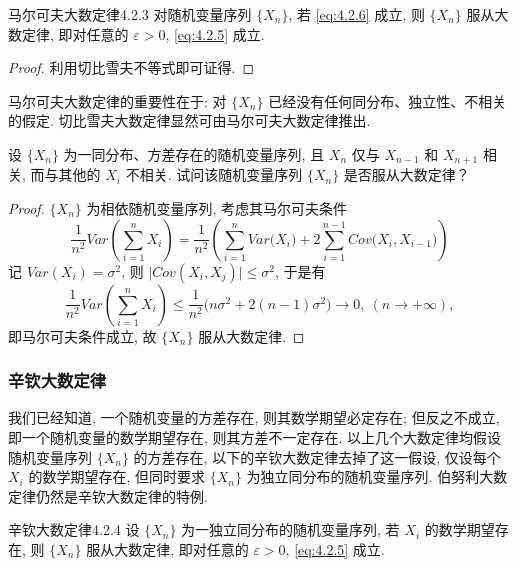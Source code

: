 \begin{theorem}{马尔可夫大数定律}{4.2.3}
    对随机变量序列 $ \{ X_n \} $, 若 \ref{eq:4.2.6} 成立, 则 $ \{ X_n \} $ 服从大数定律, 即对任意的 $ \varepsilon > 0 $, \eqref{eq:4.2.5} 成立.
\end{theorem}

\begin{proof}
    利用切比雪夫不等式即可证得.
\end{proof}

马尔可夫大数定律的重要性在于: 对 $ \{ X_n \} $ 已经没有任何同分布、独立性、不相关的假定.
切比雪夫大数定律显然可由马尔可夫大数定律推出.

\begin{example}\label{exam:4.2.3}
    设 $ \{ X_n \} $ 为一同分布、方差存在的随机变量序列, 且 $ X_n $ 仅与 $ X_{n-1} $ 和 $ X_{n+1} $ 相关, 而与其他的 $ X_i $ 不相关.
    试问该随机变量序列 $ \{ X_n \} $ 是否服从大数定律？
\end{example}

\begin{proof}
    $ \{ X_n \} $ 为相依随机变量序列, 考虑其马尔可夫条件
    \begin{equation*}
        \frac{1}{n^2} Var \left( \sum_{i=1}^n X_i \right) = \frac{1}{n^2} \left( \sum_{i=1}^n Var \bigl( X_i \bigr) + 2 \sum_{i=1}^{n-1} Cov \bigl( X_i, X_{i-1} \bigr) \right)
    \end{equation*}
    记 $ Var ( X_i ) = \sigma^2 $, 则 $ \lvert Cov ( X_i, X_j ) \rvert \leq \sigma^2 $, 于是有
    \begin{equation*}
        \frac{1}{n^2} Var \left( \sum_{i=1}^n X_i \right) \leq \frac{1}{n^2} \bigl( n \sigma^2 + 2 ( n - 1 ) \sigma^2 \bigr) \to 0, \ ( n \to +\infty ),
    \end{equation*}
    即马尔可夫条件成立, 故 $ \{ X_n \} $ 服从大数定律.
\end{proof}

\subsubsection{辛钦大数定律}

我们已经知道, 一个随机变量的方差存在, 则其数学期望必定存在; 但反之不成立, 即一个随机变量的数学期望存在, 则其方差不一定存在.
以上几个大数定律均假设随机变量序列 $ \{ X_n \} $ 的方差存在, 以下的辛钦大数定律去掉了这一假设, 仅设每个 $ X_i $ 的数学期望存在, 但同时要求 $ \{ X_n \} $ 为独立同分布的随机变量序列.
伯努利大数定律仍然是辛钦大数定律的特例.

\begin{theorem}{辛钦大数定律}{4.2.4}
    设 $ \{ X_n \} $ 为一独立同分布的随机变量序列, 若 $ X_i $ 的数学期望存在, 则 $ \{ X_n \} $ 服从大数定律, 即对任意的 $ \varepsilon > 0 $, \eqref{eq:4.2.5} 成立.
\end{theorem}

